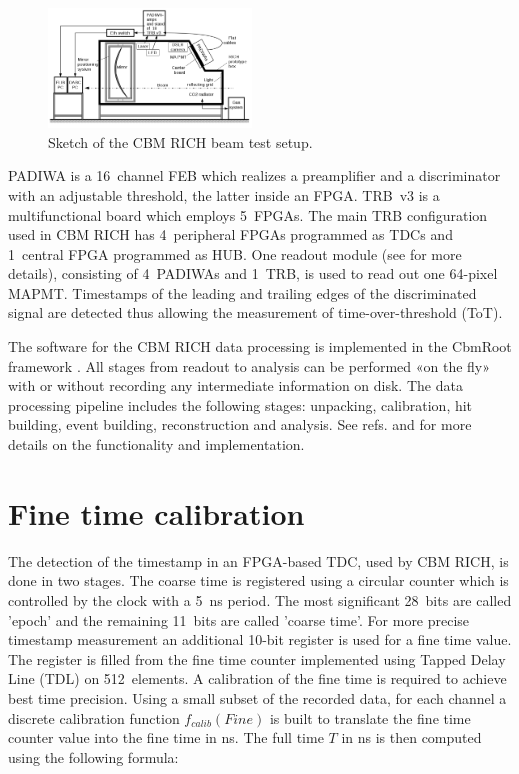 \documentclass[final,5p,times,twocolumn]{elsarticle}
\begin{document}
\begin{figure}[h]
	\centering
	\includegraphics[width=0.48\textwidth]{figures/Beamtime_eng_RICH2016_poster.png}
	\caption{Sketch of the CBM RICH beam test setup.}
	\label{fig:BeamSetup}
\end{figure}

PADIWA is a 16~channel FEB which realizes a preamplifier and a discriminator with an adjustable threshold, the latter inside an FPGA. TRB~v3 is a multifunctional board which employs 5~FPGAs. The main TRB configuration used in CBM RICH has 4~peripheral FPGAs programmed as TDCs \cite{TDC} and 1~central FPGA programmed as HUB. One readout module (see \cite{PEPAN} for more details), consisting of 4~PADIWAs and 1~TRB, is used to read out one 64-pixel MAPMT. Timestamps of the leading and trailing edges of the discriminated signal are detected thus allowing the measurement of time-over-threshold (ToT).

The software for the CBM RICH data processing is implemented in the CbmRoot framework \cite{SEMEN}. All stages from readout to analysis can be performed «on the fly» with or without recording any intermediate information on disk. The data processing pipeline includes the following stages: unpacking, calibration, hit building, event building, reconstruction and analysis. See refs. \cite{PEPAN} and \cite{RINGS} for more details on the functionality and implementation.


\section{Fine time calibration}

The detection of the timestamp in an FPGA-based TDC, used by CBM RICH, is done in two stages. The coarse time is registered using a circular counter which is controlled by the clock with a 5~ns period. The most significant 28~bits are called 'epoch' and the remaining 11~bits are called 'coarse time'. For more precise timestamp measurement an additional 10-bit register is used for a fine time value. The register is filled from the fine time counter implemented using Tapped Delay Line (TDL) on 512~elements. A calibration of the fine time is required to achieve best time precision. Using a small subset of the recorded data, for each channel a discrete calibration function $ f_{calib}(Fine) $ is built to translate the fine time counter value into the fine time in ns. The full time $ T $ in ns is then computed using the following formula:
\end{document}
